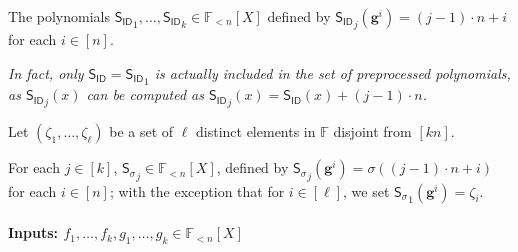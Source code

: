 \documentclass[11pt]{article} %
\newcommand{\F}{\ensuremath{\mathbb F}\xspace}
\newcommand{\hgen}{\ensuremath{\mathbf{g}}\xspace}
\newcommand{\polysofdeg}[1]{\ensuremath{\F_{< #1}[X]}\xspace}
\newcommand{\sigpoly}{\ensuremath{\mathsf{S_{\sigma}}}\xspace}
\newcommand{\idpoly}{\ensuremath{\mathsf{S_{ID}}}\xspace}
\begin{document}
The polynomials $\idpoly_1,\ldots,\idpoly_k \in \polysofdeg{n}$ defined by $\idpoly_j(\hgen^i) =(j-1)\cdot n + i$ for each $i\in [n]$.

\emph{In fact, only $\idpoly=\idpoly_1$ is actually included in the set of preprocessed polynomials, as $\idpoly_j(x)$ can be computed as $ \idpoly_j(x) = \idpoly(x) + (j-1)\cdot n$.}


Let $(\zeta_1,\ldots,\zeta_\ell)$ be a set of $\ell$ distinct elements in \F disjoint from $[kn]$.

For each $j\in [k]$, $\sigpoly_j \in \polysofdeg{n}$, defined by
$\sigpoly_j(\hgen^{i}) = \sigma((j-1)\cdot n + i)$ for each $i\in [n]$;
with the exception that for $i\in [\ell]$, we set $\sigpoly_1(\hgen^{i}) = \zeta_i$.


\paragraph{Inputs: $f_1,\ldots,f_k,g_1,\ldots,g_k \in \polysofdeg{n}$}
\end{document}
